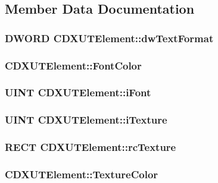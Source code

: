 \subsection{Member Data Documentation}
\hypertarget{class_c_d_x_u_t_element_a5b22f735f51c0380731339c611ec3a21}{
\subsubsection[{dwTextFormat}]{\setlength{\rightskip}{0pt plus 5cm}DWORD {\bf CDXUTElement::dwTextFormat}}}
\label{class_c_d_x_u_t_element_a5b22f735f51c0380731339c611ec3a21}
\hypertarget{class_c_d_x_u_t_element_ac853da0ce0830e80e5ec969c89762079}{
\subsubsection[{FontColor}]{ {\bf CDXUTElement::FontColor}}}
\label{class_c_d_x_u_t_element_ac853da0ce0830e80e5ec969c89762079}
\hypertarget{class_c_d_x_u_t_element_a7f492bcce7116c2fc933a9e7be0b4f1a}{
\subsubsection[{iFont}]{\setlength{\rightskip}{0pt plus 5cm}UINT {\bf CDXUTElement::iFont}}}
\label{class_c_d_x_u_t_element_a7f492bcce7116c2fc933a9e7be0b4f1a}
\hypertarget{class_c_d_x_u_t_element_a1e79d31003ef5a165cdf4a6fe456840b}{
\subsubsection[{iTexture}]{\setlength{\rightskip}{0pt plus 5cm}UINT {\bf CDXUTElement::iTexture}}}
\label{class_c_d_x_u_t_element_a1e79d31003ef5a165cdf4a6fe456840b}
\hypertarget{class_c_d_x_u_t_element_a3f74c622496396f35eff3fe9e332014d}{
\subsubsection[{rcTexture}]{\setlength{\rightskip}{0pt plus 5cm}RECT {\bf CDXUTElement::rcTexture}}}
\label{class_c_d_x_u_t_element_a3f74c622496396f35eff3fe9e332014d}
\hypertarget{class_c_d_x_u_t_element_a52129b00dee0564016627a7a22a41f02}{
\subsubsection[{TextureColor}]{ {\bf CDXUTElement::TextureColor}}}
\label{class_c_d_x_u_t_element_a52129b00dee0564016627a7a22a41f02}


